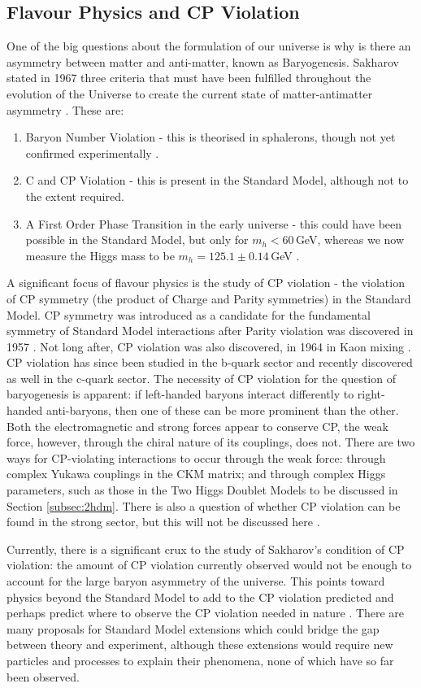 \documentclass[a4paper,12pt]{article}
\begin{document}
\subsection{Flavour Physics and CP Violation}
\label{subsec:flavobs}
One of the big questions about the formulation of our universe is why is there an asymmetry between matter and anti-matter, known as Baryogenesis. 
Sakharov stated in 1967 three criteria that must have been fulfilled throughout the evolution of the Universe to create the current state of matter-antimatter asymmetry \cite{sak}. 
These are:
\begin{enumerate}
    \item Baryon Number Violation - this is theorised in sphalerons, though not yet confirmed experimentally \cite{sphal}. 
    \item C and CP Violation - this is present in the Standard Model, although not to the extent required. 
    \item A First Order Phase Transition in the early universe - this could have been possible in the Standard Model, but only for $m_h<60\,$GeV, whereas we now measure the Higgs mass to be $m_h=125.1\pm0.14\,$GeV \cite{pdg}.
\end{enumerate}
A significant focus of flavour physics is the study of CP violation - the violation of CP symmetry (the product of Charge and Parity symmetries) in the Standard Model.
CP symmetry was introduced as a candidate for the fundamental symmetry of Standard Model interactions after Parity violation was discovered in 1957 \cite{wu}.
Not long after, CP violation was also discovered, in 1964 in Kaon mixing \cite{cpv}.
CP violation has since been studied in the b-quark sector and recently discovered as well in the c-quark sector. 
The necessity of CP violation for the question of baryogenesis is apparent: if left-handed baryons interact differently to right-handed anti-baryons, then one of these can be more prominent than the other. 
Both the electromagnetic and strong forces appear to conserve CP, the weak force, however, through the chiral nature of its couplings, does not.
There are two ways for CP-violating interactions to occur through the weak force: through complex Yukawa couplings in the CKM matrix; and through complex Higgs parameters, such as those in the Two Higgs Doublet Models to be discussed in Section \ref{subsec:2hdm}.
There is also a question of whether CP violation can be found in the strong sector, but this will not be discussed here \cite{kane}.

Currently, there is a significant crux to the study of Sakharov's condition of CP violation: the amount of CP violation currently observed would not be enough to account for the large baryon asymmetry of the universe. 
This points toward physics beyond the Standard Model to add to the CP violation predicted and perhaps predict where to observe the CP violation needed in nature \cite{dono}. 
There are many proposals for Standard Model extensions which could bridge the gap between theory and experiment, although these extensions would require new particles and processes to explain their phenomena, none of which have so far been observed. 
\end{document}
